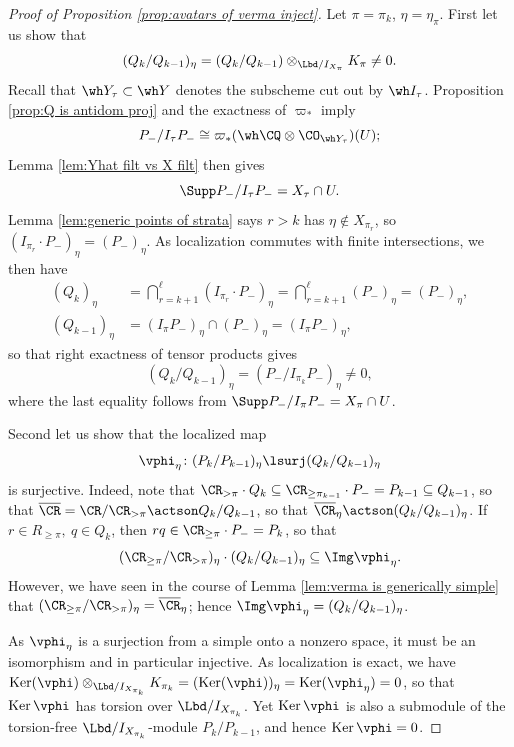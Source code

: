 \documentclass[11pt,reqno]{amsart}
\begin{document}
\begin{proof}[Proof of Proposition \ref{prop:avatars of verma inject}]
    Let $\pi=\pi_k$, $\eta=\eta_\pi$. First let us show that $$(Q_k/Q_{k-1})_{\eta}=(Q_k/Q_{k-1})\otimes_{\Lbd/I_{X_\pi}} K_{\pi}\neq 0.$$
    Recall that $\wh Y_\tau\subset \wh Y$ denotes the subscheme cut out by $\wh I_\tau$. Proposition \ref{prop:Q is antidom proj} and the exactness of $\varpi_*$ imply
    \[P_-/I_\tau P_-\cong \varpi_*(\wh\CQ\otimes\CO_{\wh Y_\tau})(U);\]
    Lemma \ref{lem:Yhat filt vs X filt} then gives
    \[\Supp P_-/I_\tau P_-= X_\tau\cap U.\] 
    Lemma \ref{lem:generic points of strata} says $r>k$ has $\eta\not\in X_{\pi_r}$, so $(I_{\pi_r}\cdot P_-)_\eta=(P_-)_\eta$. As localization commutes with finite intersections, we then have
    \begin{align*}
        (Q_k)_\eta&=\bigcap_{r=k+1}^\ell (I_{\pi_r}\cdot P_-)_\eta=\bigcap_{r=k+1}^\ell (P_-)_\eta=(P_-)_\eta,\\
        (Q_{k-1})_\eta&=(I_\pi P_-)_\eta\cap (P_-)_\eta = (I_\pi P_-)_\eta,
    \end{align*}
    so that right exactness of tensor products gives
    \[(Q_k/Q_{k-1})_\eta=(P_-/I_{\pi_k} P_-)_\eta\neq 0,\] 
    where the last equality follows from $\Supp P_-/I_\pi P_-=X_\pi\cap U$. 
    
    

    Second let us show that the localized map
    \[\vphi_\eta\colon (P_k/P_{k-1})_{\eta}\lsurj (Q_k/Q_{k-1})_{\eta}\] 
    is surjective. Indeed, note that $\CR_{>\pi}\cdot Q_k\subseteq \CR_{\ge\pi_{k-1}}\cdot P_-=P_{k-1}\subseteq Q_{k-1}$, so that $\ol\CR=\CR/\CR_{>\pi}\actson Q_k/Q_{k-1}$, so that $\ol\CR_\eta\actson (Q_k/Q_{k-1})_\eta$. If $r\in R_{\ge\pi},\ q\in Q_k$, then $rq\in \CR_{\ge\pi}\cdot P_-=P_k$, so that
    \[(\CR_{\ge\pi}/\CR_{>\pi})_\eta\cdot (Q_k/Q_{k-1})_\eta\subseteq\Img\vphi_\eta.\] 
    However, we have seen in the course of Lemma \ref{lem:verma is generically simple} that $(\CR_{\ge\pi}/\CR_{>\pi})_\eta=\ol\CR_\eta$; hence $\Img\vphi_\eta=(Q_k/Q_{k-1})_\eta$.
    

    As $\vphi_\eta$ is a surjection from a simple onto a nonzero space, it must be an isomorphism and in particular injective. As localization is exact, we have $\ker(\vphi)\otimes_{\Lbd/I_{X_{\pi_k}}}K_{\pi_k}=(\ker(\vphi))_{\eta}=\ker(\vphi_\eta)=0$, so that $\ker\vphi$ has torsion over $\Lbd/I_{X_{\pi_k}}$. Yet $\ker\vphi$ is also a submodule of the torsion-free $\Lbd/I_{X_{\pi_k}}$-module $P_k/P_{k-1}$, and hence $\ker\vphi=0$.  
\end{proof}
\end{document}
